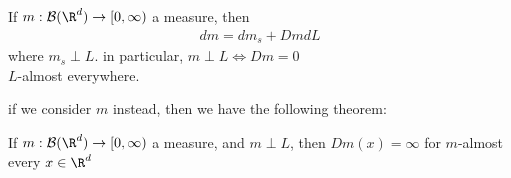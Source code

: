 \begin{corollary}
	If $m : \mathcal{B}(\R^d) \to [0, \infty)$ a measure, then
	\begin{align*}
		dm = dm_{s} + Dm dL
	\end{align*} where $m_s \perp L$. in particular, $m \perp L \iff Dm = 0$ \\
	$L$-almost everywhere.
\end{corollary}

\begin{remark}
	if we consider $m$ instead, then we have the following theorem:
\end{remark}

\begin{theorem}
	If $m : \mathcal{B}(\R^d) \to [0, \infty)$ a measure, and $m \perp L$, then $D m(x) = \infty$ for $m$-almost every $x \in \R^d$
\end{theorem}

